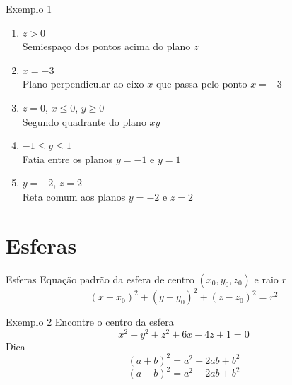 \begin{frame}{Exemplo 1}
  \begin{enumerate}[<+->]
    \item \(z > 0\) \\
          Semiespaço dos pontos acima do plano $z$
    \item \(x = -3\) \\
          Plano perpendicular ao eixo $x$ que passa pelo ponto $x=-3$
    \item \(z=0\), \(x\leq 0\), \(y\geq 0\) \\
          Segundo quadrante do plano $xy$
    \item \(-1\leq y \leq 1\) \\
          Fatia entre os planos \(y=-1\) e \(y=1\)
    \item \(y=-2\), \(z=2\) \\
          Reta comum aos planos \(y=-2\) e \(z=2\)
  \end{enumerate}
\end{frame}

\section{Esferas}

\begin{frame}{Esferas}
  Equação padrão da esfera de centro \((x_0, y_0, z_0)\) e raio \(r\)
  \[
    \left(x-x_0\right)^2 + \left(y-y_0\right)^2 + \left(z-z_0\right)^2 = r^2
  \]
\end{frame}

\begin{frame}{Exemplo 2}
  Encontre o centro da esfera
  \[
    x^2 + y^2 + z^2 + 6x - 4z + 1 = 0
  \]
  \pause
  Dica
  \[
    (a+b)^2 = a^2 + 2ab + b^2
  \]
  \[
    (a-b)^2 = a^2 - 2ab + b^2
  \]
\end{frame}

